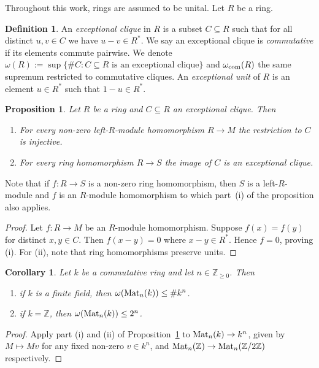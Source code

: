 \documentclass{amsart}
\theoremstyle{plain}
\newtheorem{proposition}[theorem]{Proposition}
\newtheorem{corollary}[theorem]{Corollary}
\theoremstyle{definition}
\newtheorem{definition}[theorem]{Definition}
\newcommand{\Z}{\ensuremath{\mathbb{Z}}}
\newcommand{\clq}{C}
\newcommand{\crg}{k}
\newcommand{\nrg}{R}
\begin{document}
Throughout this work, rings are assumed to be unital. Let \(\nrg\) be a ring.

\begin{definition}
An \emph{exceptional clique} in \(\nrg\) is a subset \(\clq\subseteq \nrg\) such that for all distinct \(u,v\in \clq\) we have \(u-v\in \nrg^*\). We say an exceptional clique is \emph{commutative} if its elements commute pairwise. We denote \(\omega(R):=\sup\{\#C: C\subseteq R \textrm{ is an exceptional clique} \}\) and \(\omega_{\textup{com}}(\nrg)\) the same supremum restricted to commutative cliques.
An \emph{exceptional unit} of \(\nrg\) is an element \(u\in \nrg^*\) such that \(1-u\in \nrg^*\).
\end{definition}


\begin{proposition}\label{prop:injective_quotient}
	Let \(\nrg\) be a ring and \(\clq\subseteq \nrg\) an exceptional clique. Then
	\begin{enumerate}[nosep]
		\item For every non-zero left-\(\nrg\)-module homomorphism \(\nrg\to M\) the restriction to \(\clq\) is injective.
		\item For every ring homomorphism \(\nrg\to S\) the image of \(\clq\) is an exceptional clique.
	\end{enumerate}
\end{proposition}
Note that if \(f:\nrg\to S\) is a non-zero ring homomorphism, then \(S\) is a left-\(\nrg\)-module and \(f\) is an \(\nrg\)-module homomorphism to which part~(i) of the proposition also applies.
\begin{proof}
	Let \(f:\nrg\to M\) be an \(\nrg\)-module homomorphism. Suppose \(f(x)=f(y)\) for distinct \(x,y\in \clq\). Then \(f(x-y)=0\) where \(x-y\in \nrg^*\). Hence \(f=0\), proving (i). For (ii), note that ring homomorphisms preserve units.
\end{proof}

\begin{corollary}\label{cor:clique_bound}
	Let \(\crg\) be a commutative ring and let \(n\in\Z_{\geq 0}\). Then
	\begin{enumerate}[nosep]
		\item if \(\crg\) is a finite field, then \(\omega(\textup{Mat}_n(\crg))\leq\#\crg^n\).
		\item if \(\crg=\Z\), then \(\omega(\textup{Mat}_n(\crg))\leq 2^n\).
	\end{enumerate}
\end{corollary}
\begin{proof}
	Apply part (i) and (ii) of Proposition~\ref{prop:injective_quotient} to \(\textup{Mat}_n(\crg)\to \crg^n\), given by \(M\mapsto Mv\) for any fixed non-zero \(v\in \crg^n\), and \(\textup{Mat}_n(\Z)\to \textup{Mat}_n(\Z/2\Z)\) respectively.
\end{proof}
\end{document}
